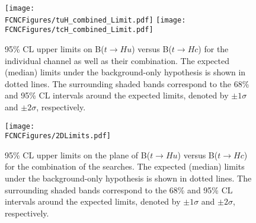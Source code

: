 \begin{figure}[htb]
\centering
\texttt{[image: \\FCNCFigures/tuH\_combined\_Limit.pdf]}
\texttt{[image: \\FCNCFigures/tcH\_combined\_Limit.pdf]}
\caption{95\% CL upper limits on B($t\rightarrow Hu$) versus B($t\rightarrow Hc$) for the individual channel as well as their combination. %
The expected (median) limits under the background-only hypothesis is shown in dotted lines. The surrounding shaded bands correspond to the 68\% and 95\% CL
intervals around the expected limits, denoted by $\pm1\sigma$ and $\pm2\sigma$, respectively. }
\label{fig:combined_limit}
\end{figure}

\begin{figure}[htb]
\centering
\texttt{[image: \\FCNCFigures/2DLimits.pdf]}
\caption{95\% CL upper limits on the plane of B($t\rightarrow Hu$) versus B($t\rightarrow Hc$) for the combination of the searches. The expected
(median) limits under the background-only hypothesis is shown in dotted lines. The surrounding shaded bands correspond to
the 68\% and 95\% CL intervals around the expected limits, denoted by $\pm1\sigma$ and $\pm2\sigma$, respectively.}
\label{fig:combined_limit}
\end{figure}